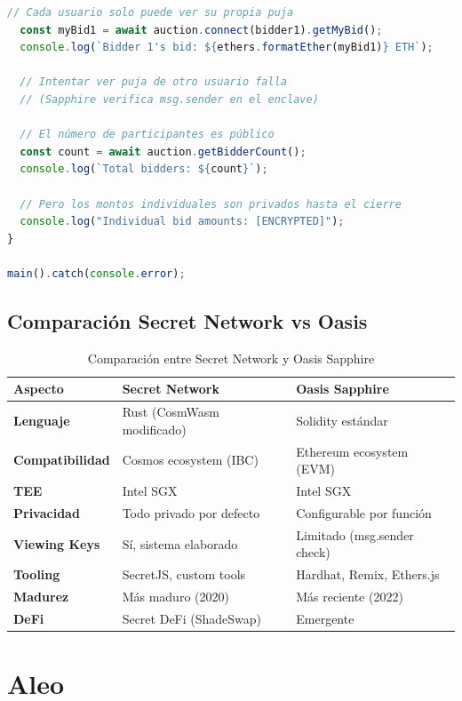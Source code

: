 \documentclass[11pt,a4paper,twoside]{book}
\theoremstyle{definition}
\theoremstyle{remark}
\begin{document}
\begin{lstlisting}[language=JavaScript, caption={Deployment y uso de contratos Sapphire con Hardhat}]
  // Cada usuario solo puede ver su propia puja
  const myBid1 = await auction.connect(bidder1).getMyBid();
  console.log(`Bidder 1's bid: ${ethers.formatEther(myBid1)} ETH`);
  
  // Intentar ver puja de otro usuario falla
  // (Sapphire verifica msg.sender en el enclave)
  
  // El número de participantes es público
  const count = await auction.getBidderCount();
  console.log(`Total bidders: ${count}`);
  
  // Pero los montos individuales son privados hasta el cierre
  console.log("Individual bid amounts: [ENCRYPTED]");
}

main().catch(console.error);
\end{lstlisting}

\subsection{Comparación Secret Network vs Oasis}

\begin{table}[htbp]
\centering
\small
\begin{tabular}{lp{4.5cm}p{4.5cm}}
\toprule
\textbf{Aspecto} & \textbf{Secret Network} & \textbf{Oasis Sapphire} \\
\midrule
\textbf{Lenguaje} & Rust (CosmWasm modificado) & Solidity estándar \\
\textbf{Compatibilidad} & Cosmos ecosystem (IBC) & Ethereum ecosystem (EVM) \\
\textbf{TEE} & Intel SGX & Intel SGX \\
\textbf{Privacidad} & Todo privado por defecto & Configurable por función \\
\textbf{Viewing Keys} & Sí, sistema elaborado & Limitado (msg.sender check) \\
\textbf{Tooling} & SecretJS, custom tools & Hardhat, Remix, Ethers.js \\
\textbf{Madurez} & Más maduro (2020) & Más reciente (2022) \\
\textbf{DeFi} & Secret DeFi (ShadeSwap) & Emergente \\
\bottomrule
\end{tabular}
\caption{Comparación entre Secret Network y Oasis Sapphire}
\end{table}
\section{Aleo}
\label{sec:aleo}
\end{document}
